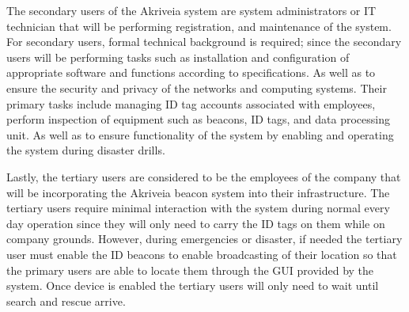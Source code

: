 \bigskip
The secondary users of the Akriveia system are system administrators or IT technician that will be 
performing registration, and maintenance of the system. For secondary users, formal technical background is required; since the secondary users will be performing tasks such as installation and configuration of appropriate software and functions according to specifications. As well as to ensure the security and privacy of the networks and computing systems. Their primary tasks include managing ID tag accounts associated with employees, perform inspection of equipment such as beacons, ID tags, and data processing unit. As well as to ensure functionality of the system by enabling and operating the system during disaster drills. 

\bigskip
Lastly, the tertiary users are considered to be the employees of the company that will be incorporating the Akriveia beacon system into their infrastructure. The tertiary users require minimal interaction with the system during normal every day operation since they will only need to carry the ID tags on them while on company grounds. However, during emergencies or disaster, if needed the tertiary user must enable the ID beacons to enable broadcasting of their location so that the primary users are able to locate them through the GUI provided by the system. Once device is enabled the tertiary users will only need to wait until search and rescue arrive.




